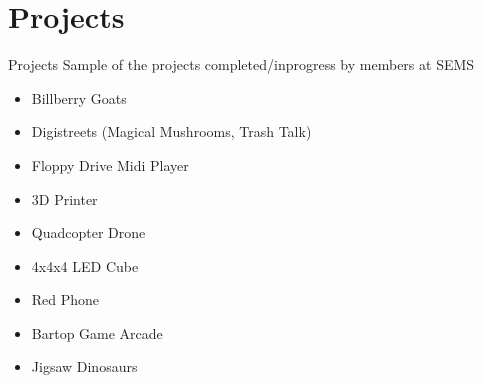 \documentclass{beamer}
\begin{document}
\section{Projects}
\begin{frame}{Projects}
Sample of the projects completed/inprogress by members at SEMS
\begin{itemize}
	\item Billberry Goats
	\item Digistreets (Magical Mushrooms, Trash Talk)
	\item Floppy Drive Midi Player
	\item 3D Printer
	\item Quadcopter Drone
	\item 4x4x4 LED Cube
	\item Red Phone
	\item Bartop Game Arcade
	\item Jigsaw Dinosaurs
\end{itemize}
\end{frame}
\end{document}
